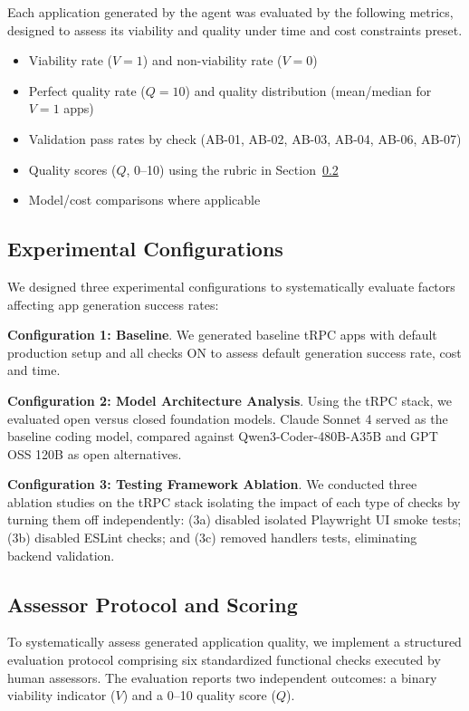 \documentclass{article}
\begin{document}
Each application generated by the agent was evaluated by the following metrics, designed to assess its viability and quality under time and cost constraints preset. 

\begin{itemize}
\item Viability rate ($V=1$) and non-viability rate ($V=0$)
\item Perfect quality rate ($Q=10$) and quality distribution (mean/median for $V=1$ apps)
\item Validation pass rates by check (AB-01, AB-02, AB-03, AB-04, AB-06, AB-07)
\item Quality scores ($Q$, 0--10) using the rubric in Section~\ref{sec:scoring}
\item Model/cost comparisons where applicable
\end{itemize}

\subsection{Experimental Configurations}

We designed three experimental configurations to systematically evaluate factors affecting app generation success rates:

\textbf{Configuration 1: Baseline}. We generated baseline tRPC apps with default production setup and all checks ON to assess default generation success rate, cost and time.

\textbf{Configuration 2: Model Architecture Analysis}. Using the tRPC stack, we evaluated open versus closed foundation models. Claude Sonnet 4 served as the baseline coding model, compared against Qwen3-Coder-480B-A35B \citep{qwen2025qwen3} and GPT OSS 120B \citep{openai2025gpt} as open alternatives.

\textbf{Configuration 3: Testing Framework Ablation}. We conducted three ablation studies on the tRPC stack isolating the impact of each type of checks by turning them off independently: (3a) disabled isolated Playwright UI smoke tests; (3b) disabled ESLint checks; and (3c) removed handlers tests, eliminating backend validation.


\subsection{Assessor Protocol and Scoring}
\label{sec:scoring}

To systematically assess generated application quality, we implement a structured evaluation protocol comprising six standardized functional checks executed by human assessors. The evaluation reports two independent outcomes: a binary viability indicator ($V$) and a 0--10 quality score ($Q$).
\end{document}
